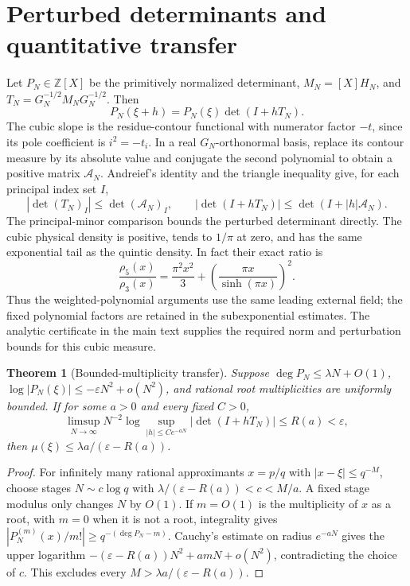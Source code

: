 \documentclass[11pt]{article}
\newtheorem{theorem}{Theorem}[section]
\theoremstyle{definition}\newtheorem{definition}[theorem]{Definition}
\theoremstyle{remark}\newtheorem{remark}[theorem]{Remark}
\begin{document}
\section{Perturbed determinants and quantitative transfer}
\label{zthree:transfer}

Let $P_N\in\mathbb Z[X]$ be the primitively normalized determinant,
$M_N=[X]H_N$, and $T_N=G_N^{-1/2}M_NG_N^{-1/2}$. Then
\[
 P_N(\xi+h)=P_N(\xi)\det(I+hT_N).
\]
The cubic slope is the residue-contour functional with numerator
factor $-t$, since its pole coefficient is $i^2=-t_i$.
In a real $G_N$-orthonormal basis, replace its contour measure by
its absolute value and conjugate the second polynomial to obtain
a positive matrix $\mathcal A_N$. Andreief's identity and the
triangle inequality give, for each principal index set $I$,
\[
 |\det(T_N)_I|\le\det(\mathcal A_N)_I,
 \qquad |\det(I+hT_N)|\le\det(I+|h|\mathcal A_N).
\]
The principal-minor comparison bounds the perturbed determinant directly.
The cubic physical density is positive, tends to $1/\pi$ at zero,
and has the same exponential tail as the quintic density. In fact
their exact ratio is
\[
 \frac{\rho_5(x)}{\rho_3(x)}
   =\frac{\pi^2x^2}{3}+\left(\frac{\pi x}{\sinh(\pi x)}\right)^2.
\]
Thus the weighted-polynomial arguments use the same leading
external field; the fixed polynomial factors are retained in the
subexponential estimates. The analytic certificate in the main text
supplies the required norm and perturbation bounds for this cubic measure.

\begin{theorem}[Bounded-multiplicity transfer]\label{zthree:transferthm}
Suppose $\deg P_N\le\lambda N+O(1)$,
$\log|P_N(\xi)|\le-\varepsilon N^2+o(N^2)$, and rational root
multiplicities are uniformly bounded. If for some $a>0$ and every
fixed $C>0$,
\[
 \limsup_{N\to\infty}N^{-2}\log
 \sup_{|h|\le Ce^{-aN}}|\det(I+hT_N)|\le R(a)<\varepsilon,
\]
then $\mu(\xi)\le\lambda a/(\varepsilon-R(a))$.
\end{theorem}
\begin{proof}
For infinitely many rational approximants $x=p/q$ with
$|x-\xi|\le q^{-M}$, choose stages $N\sim c\log q$ with
$\lambda/(\varepsilon-R(a))<c<M/a$. A fixed stage modulus only
changes $N$ by $O(1)$. If $m=O(1)$ is the multiplicity of $x$ as
a root, with $m=0$ when it is not a root, integrality gives
$|P_N^{(m)}(x)/m!|\ge q^{-(\deg P_N-m)}$.
Cauchy's estimate on radius $e^{-aN}$ gives the upper logarithm
$-(\varepsilon-R(a))N^2+amN+o(N^2)$, contradicting the choice
of $c$. This excludes every $M>\lambda a/(\varepsilon-R(a))$.
\end{proof}
\end{document}
